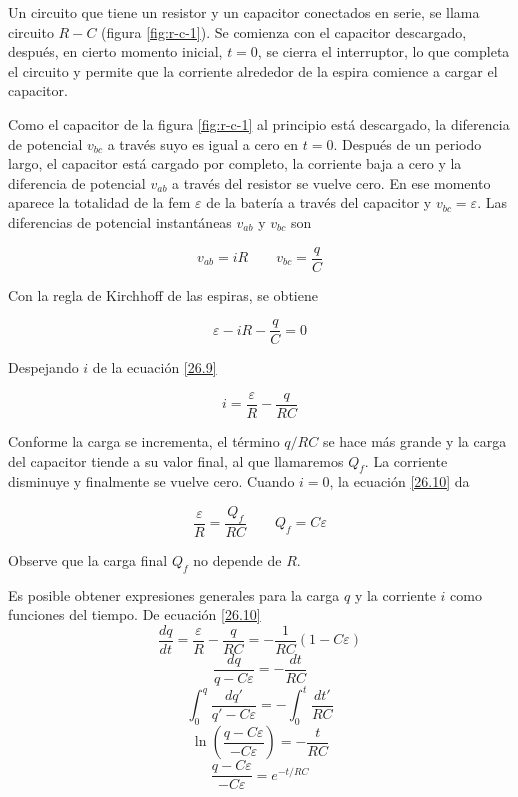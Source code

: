 Un circuito que tiene un resistor y un capacitor conectados en serie, se llama circuito $R-C$ (figura \ref{fig:r-c-1}). Se comienza con el capacitor descargado, después, en cierto momento inicial, $t=0$, se cierra el interruptor, lo que completa el circuito y permite que la corriente alrededor de la espira comience a cargar el capacitor.

Como el capacitor de la figura \ref{fig:r-c-1} al principio está descargado, la diferencia de potencial $v_{bc}$ a través suyo es igual a cero en $t=0$. Después de un periodo largo, el capacitor está cargado por completo, la corriente baja a cero y la diferencia de potencial $v_{ab}$ a través del resistor se vuelve cero. En ese momento aparece la totalidad de la fem $\varepsilon$ de la batería a través del capacitor y $v_{bc}=\varepsilon$. Las diferencias de potencial instantáneas $v_{ab}$ y $v_{bc}$ son

\begin{equation*}
v_{ab}=iR \qquad v_{bc}=\frac{q}{C}
\end{equation*}

Con la regla de Kirchhoff de las espiras, se obtiene

\begin{equation}\label{26.9}
\varepsilon -iR-\frac{q}{C}=0
\end{equation}

Despejando $i$ de la ecuación \ref{26.9}

\begin{equation}\label{26.10}
i=\frac{\varepsilon}{R}-\frac{q}{RC}
\end{equation}

Conforme la carga se incrementa, el término $q/RC$ se hace más grande y la carga del capacitor tiende a su valor final, al que llamaremos $Q_f$. La corriente disminuye y finalmente se vuelve cero. Cuando $i=0$, la ecuación \ref{26.10} da 

\begin{equation}\label{26.11}
\frac{\varepsilon}{R}=\frac{Q_f}{RC} \qquad Q_f=C\varepsilon
\end{equation}

Observe que la carga final $Q_f$ no depende de $R$.

Es posible obtener expresiones generales para la carga $q$ y la corriente $i$ como funciones del tiempo. De ecuación \ref{26.10}
\begin{equation*}
\frac{dq}{dt}=\frac{\varepsilon}{R}-\frac{q}{RC}=-\frac{1}{RC}(1-C\varepsilon)
\end{equation*}
\begin{equation*}
\frac{dq}{q-C\varepsilon}=-\frac{dt}{RC}
\end{equation*}
\begin{equation*}
\int_0^q\frac{dq'}{q'-C\varepsilon}=-\int_0^t\frac{dt'}{RC}
\end{equation*}
\begin{equation*}
\ln\left(\frac{q-C\varepsilon}{-C\varepsilon}\right)=-\frac{t}{RC}
\end{equation*}
\begin{equation*}
\frac{q-C\varepsilon}{-C\varepsilon}=e^{-t/RC}
\end{equation*}

